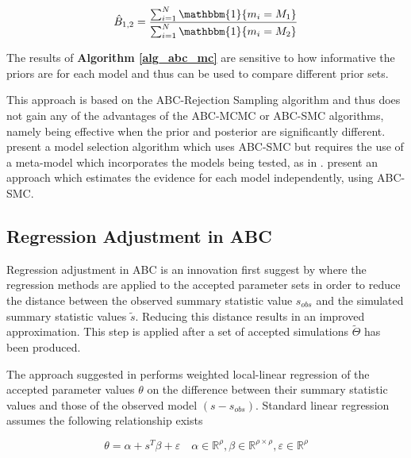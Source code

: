 \documentclass[11pt,a4paper]{article}
\theoremstyle{break}
\begin{document}
  \[ \hat{B}_{1,2}=\frac{\sum_{i=1}^N\mathbbm{1}\{m_i=M_1\}}{\sum_{i=1}^N\mathbbm{1}\{m_i=M_2\}} \]

  \par The results of \textbf{Algorithm \ref{alg_abc_mc}} are sensitive to how informative the priors are for each model and thus can be used to compare different prior sets.


  \par This approach is based on the ABC-Rejection Sampling algorithm and thus does not gain any of the advantages of the ABC-MCMC or ABC-SMC algorithms, namely being effective when the prior and posterior are significantly different. \cite[]{abc_scgene_for_parameter_inference_and_model_selection_in_dynamical_systems} present a model selection algorithm which uses ABC-SMC but requires the use of a meta-model which incorporates the models being tested, as in \cite[]{abc_likelihood_free_methods_for_model_choice_in_gibbs_random_fields}. \cite[]{likelihood_free_estimation_of_model_evidence} present an approach which estimates the evidence for each model independently, using ABC-SMC.

\subsection{Regression Adjustment in ABC}\label{sec_abc_regression_adjustment}

  \par Regression adjustment in ABC is an innovation first suggest by \cite[]{ABC_in_population_genetics} where the regression methods are applied to the accepted parameter sets in order to reduce the distance between the observed summary statistic value $s_{obs}$ and the simulated summary statistic values $\tilde{s}$. Reducing this distance results in an improved approximation. This step is applied after a set of accepted simulations $\tilde\Theta$ has been produced.

  \par The approach suggested in \cite[]{ABC_in_population_genetics} performs weighted local-linear regression of the accepted parameter values $\theta$ on the difference between their summary statistic values and those of the observed model $(s-s_{obs})$. Standard linear regression assumes the following relationship exists

  \[ \theta=\alpha+s^T\beta+\varepsilon\quad\alpha\in\mathbb{R}^{\rho},\beta\in\mathbb{R}^{\rho\times\rho},\varepsilon\in\mathbb{R}^\rho \]
\end{document}

